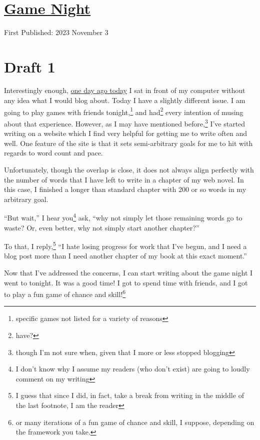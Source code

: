 \documentclass[12pt]{article}[titlepage]
\newcommand{\say}[1]{``#1''}
\newcommand{\1}{\={a}}
\newcommand{\2}{\={e}}
\newcommand{\3}{\={\i}}
\newcommand{\4}{\=o}
\newcommand{\5}{\=u}
\newcommand{\6}{\={A}}
\renewcommand{\,}{\textsuperscript{,}}
\begin{document}

\doublespacing
\section{\href{game-night.html}{Game Night}}
First Published: 2023 November 3
\section{Draft 1}
Interestingly enough, \href{writers-block-5.html}{one day ago today} I sat in front of my computer without any idea what I would blog about.
Today I have a slightly different issue.
I am going to play games with friends tonight,\footnote{specific games not listed for a variety of reasons} and had\footnote{have?} every intention of musing about that experience.
However, as I may have mentioned before,\footnote{though I'm not sure when, given that I more or less stopped blogging} I've started writing on a website which I find very helpful for getting me to write often and well.
One feature of the site is that it sets semi-arbitrary goals for me to hit with regards to word count and pace.

Unfortunately, though the overlap is close, it does not always align perfectly with the number of words that I have left to write in a chapter of my web novel.
In this case, I finished a longer than standard chapter with 200 or so words in my arbitrary goal.

\say{But wait,} I hear you\footnote{I don't know why I assume my readers (who don't exist) are going to loudly comment on my writing} ask, \say{why not simply let those remaining words go to waste?
Or, even better, why not simply start another chapter?}

To that, I reply,\footnote{I guess that since I did, in fact, take a break from writing in the middle of the last footnote, I am the reader} \say{I hate losing progress for work that I've begun, and I need a blog post more than I need another chapter of my book at this exact moment.}

Now that I've addressed the concerns, I can start writing about the game night I went to tonight.
It was a good time!
I got to spend time with friends, and I got to play a fun game of chance and skill!\footnote{or many iterations of a fun game of chance and skill, I suppose, depending on the framework you take.}
\end{document}
